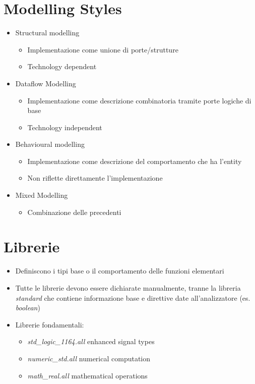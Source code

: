\documentclass{article}
\begin{document}
\section{Modelling Styles}
\begin{itemize}
  \item Structural modelling
        \begin{itemize}
          \item Implementazione come unione di porte/strutture
          \item Technology dependent
        \end{itemize}
  \item Dataflow Modelling
        \begin{itemize}
          \item Implementazione come descrizione combinatoria tramite porte logiche di base
          \item Technology independent
        \end{itemize}
  \item Behavioural modelling
        \begin{itemize}
          \item Implementazione come descrizione del comportamento che ha l'entity
          \item Non riflette direttamente l'implementazione
        \end{itemize}
  \item Mixed Modelling
        \begin{itemize}
          \item Combinazione delle precedenti
        \end{itemize}
\end{itemize}

\section{Librerie}
\begin{itemize}
  \item Definiscono i tipi base o il comportamento delle funzioni elementari
  \item Tutte le librerie devono essere dichiarate manualmente, tranne la libreria \textit{standard} che contiene informazione base e direttive date all'analizzatore (es. \textit{boolean})
  \item Librerie fondamentali:
        \begin{itemize}
          \item \textit{std\_logic\_1164.all} enhanced signal types
          \item \textit{numeric\_std.all} numerical computation
          \item \textit{math\_real.all} mathematical operations
        \end{itemize}
\end{itemize}
\end{document}
